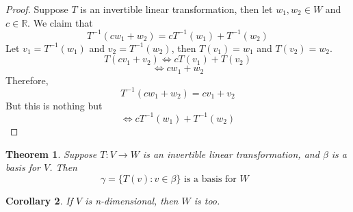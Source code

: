 \documentclass{article}
\newtheorem{theorem}{Theorem}[section]
\newtheorem{corollary}[theorem]{Corollary}
\newtheorem{one minute paper}[theorem]{One Minute Paper}
\begin{document}
\begin{proof}
    Suppose $T$ is an invertible linear transformation, then let $w_1,w_2 \in W$ and $c \in \mathbb{R}$. We claim that 
    \begin{equation}
        T^{-1}(cw_1 + w_2) = cT^{-1}(w_1) + T^{-1}(w_2)
    \end{equation}
    Let $v_1 = T^{-1}(w_1)$ and $v_2 = T^{-1}(w_2)$, then $T(v_1) = w_1$ and $T(v_2) = w_2$.
    \begin{equation}
        T(cv_1 + v_2) \iff cT(v_1) + T(v_2)
    \end{equation} 
    \begin{equation}
        \iff cw_1 + w_2
    \end{equation}
    Therefore, 
    \begin{equation}
        T^{-1}(cw_1 + w_2) = cv_1 + v_2
    \end{equation}
    But this is nothing but 
    \begin{equation}
        \iff cT^{-1}(w_1) + T^{-1}(w_2)
    \end{equation}
\end{proof}

\begin{theorem}
    Suppose $T: V \rightarrow W$ is an invertible linear transformation, and $\beta$ is a basis for $V$. Then 
    \begin{equation}
        \gamma = \{T(v) : v \in \beta\} \text{ is a basis for $W$ }
    \end{equation}
\end{theorem}

\begin{corollary}
    If $V$ is n-dimensional, then $W$ is too. 
\end{corollary}
\end{document}
